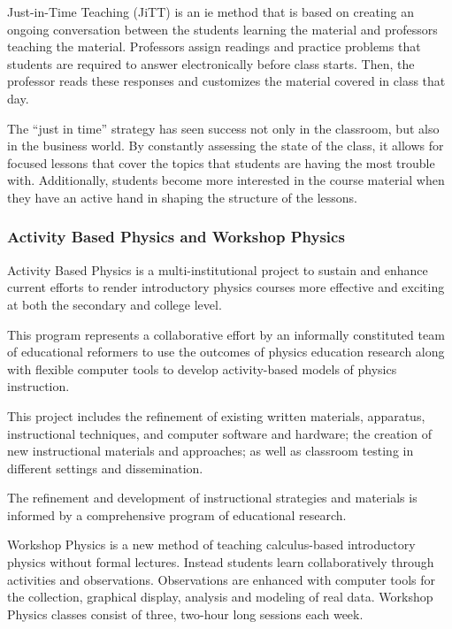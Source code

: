 Just-in-Time Teaching (JiTT) is an \gls{ie} method that is based on creating an ongoing conversation between the students learning the material and professors teaching the material. Professors assign readings and practice problems that students are required to answer electronically before class starts. Then, the professor reads these responses and customizes the material covered in class that day\cite{novak1999}.

The ``just in time'' strategy has seen success not only in the classroom, but also in the business world. By constantly assessing the state of the class, it allows for focused lessons that cover the topics that students are having the most trouble with. Additionally, students become more interested in the course material when they have an active hand in shaping the structure of the lessons.

\subsubsection{Activity Based Physics and Workshop Physics}

Activity Based Physics is a multi-institutional project to sustain and enhance current efforts to render introductory physics courses more effective and exciting at both the secondary and college level.

This program represents a collaborative effort by an informally constituted team of educational reformers to use the outcomes of physics education research along with flexible computer tools to develop activity-based models of physics instruction.

This project includes the refinement of existing written materials, apparatus, instructional techniques, and computer software and hardware; the creation of new instructional materials and approaches; as well as classroom testing in different settings and dissemination.

The refinement and development of instructional strategies and materials is informed by a comprehensive program of educational research.

Workshop Physics is a new method of teaching calculus-based introductory physics without formal lectures. Instead students learn collaboratively through activities and observations. Observations are enhanced with computer tools for the collection, graphical display, analysis and modeling of real data. Workshop Physics classes consist of three, two-hour long sessions each week.

